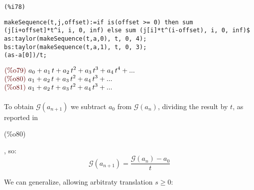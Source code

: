 \noindent
\begin{minipage}[t]{8ex}{\color{red}\bf
\begin{verbatim}
(%i78)
\end{verbatim}}
\end{minipage}
\begin{minipage}[t]{\textwidth}{\color{blue}
\begin{verbatim}
makeSequence(t,j,offset):=if is(offset >= 0) then sum
(j[i+offset]*t^i, i, 0, inf) else sum (j[i]*t^(i-offset), i, 0, inf)$
as:taylor(makeSequence(t,a,0), t, 0, 4);
bs:taylor(makeSequence(t,a,1), t, 0, 3);
(as-a[0])/t;
\end{verbatim}}
\end{minipage}
\begin{math}\displaystyle
\parbox{8ex}{\color{labelcolor}(\%o79) }
{a}_{0}+{a}_{1}\,t+{a}_{2}\,{t}^{2}+{a}_{3}\,{t}^{3}+{a}_{4}\,{t}^{4}+...
\end{math}\\
\begin{math}\displaystyle
\parbox{8ex}{\color{labelcolor}(\%o80) }
{a}_{1}+{a}_{2}\,t+{a}_{3}\,{t}^{2}+{a}_{4}\,{t}^{3}+...
\end{math}\\
\begin{math}\displaystyle
\parbox{8ex}{\color{labelcolor}(\%o81) }
{a}_{1}+{a}_{2}\,t+{a}_{3}\,{t}^{2}+{a}_{4}\,{t}^{3}+...
\end{math}
\\\\
To obtain $\mathcal{G}(a_{n+1})$ we subtract $a_0$ from $\mathcal{G}
(a_n)$, dividing the result by $t$, as reported
in \parbox{8ex}{\color{labelcolor}(\%o80) }, so:
\begin{equation*}
\mathcal{G}(a_{n+1})
= \frac{\mathcal{G} (a_n) - a_0}{t}
\end{equation*}

We can generalize, allowing arbitraty translation $s \geq 0$:

